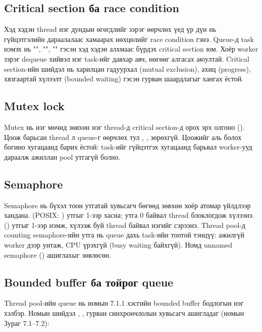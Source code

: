 \documentclass[12pt,a4paper]{article}
\begin{document}
\subsection{Critical section ба race condition}

Хэд хэдэн thread нэг дундын өгөгдлийг зэрэг өөрчлөх үед үр дүн нь гүйцэтгэлийн дараалалаас хамаарах нөхцөлийг race condition гэнэ. Queue-д task нэмэх нь "", "", "" гэсэн хэд хэдэн алхмаас бүрдэх critical section юм. Хоёр worker зэрэг dequeue хийвэл нэг task-ийг давхар авч, нөгөөг алгасах аюултай. Critical section-ийн шийдэл нь харилцан гадуурхал (mutual exclusion), ахиц (progress), хязгаартай хүлээлт (bounded waiting) гэсэн гурван шаардлагыг хангах ёстой.

\subsection{Mutex lock}

Mutex нь нэг мөчид зөвхөн нэг thread-д critical section-д орох эрх олгоно (). Цоож барьсан thread л queue-г өөрчлөх тул , ,  зөрөхгүй. Цоожийг аль болох богино хугацаанд барих ёстой: task-ийг гүйцэтгэх хугацаанд барьвал worker-ууд дараалж ажиллан pool утгагүй болно.

\subsection{Semaphore}

Semaphore нь бүхэл тоон утгатай хувьсагч бөгөөд зөвхөн хоёр атомар үйлдлээр хандана.  (POSIX: ) утгыг 1-ээр хасна; утга 0 байвал thread блоклогдож хүлээнэ.  () утгыг 1-ээр нэмж, хүлээж буй thread байвал нэгийг сэрээнэ. Thread pool-д counting semaphore-ийн утга нь queue дахь task-ийн тоотой тэнцүү: ажилгүй worker  дээр унтаж, CPU үрэхгүй (busy waiting байхгүй). Номд unnamed semaphore () ашиглахыг зөвлөсөн.

\subsection{Bounded buffer ба тойрог queue}

Thread pool-ийн queue нь номын 7.1.1 хэсгийн bounded buffer бодлогын нэг хэлбэр. Номын шийдэл , ,  гурван синхрончлолын хувьсагч ашигладаг (номын Зураг 7.1–7.2):
\end{document}
